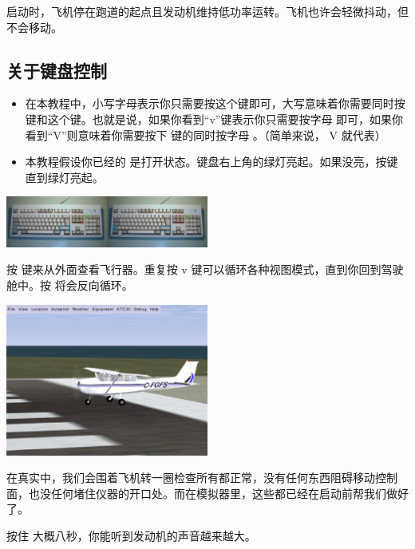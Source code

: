 启动时，飞机停在跑道的起点且发动机维持低功率运转。飞机也许会轻微抖动，但不会移动。

\subsection*{关于键盘控制}

\begin{itemize}
    \item 在本教程中，小写字母表示你只需要按这个键即可，大写意味着你需要同时按 \textcolor{blue}{} 键和这个键。也就是说，如果你看到“v”键表示你只需要按字母  即可，如果你看到“V”则意味着你需要按下  键的同时按字母 。（简单来说， V 就代表）
    \item 本教程假设你已经的  是打开状态。键盘右上角的绿灯亮起。如果没亮，按\textcolor{green}{}键直到绿灯亮起。
    \end{itemize}

\begin{center}
\includegraphics[width=0.5\textwidth]{img/tut_7}
\end{center}
    

按  键来从外面查看飞行器。重复按 v 键可以循环各种视图模式，直到你回到驾驶舱中。按  将会反向循环。

\begin{center}
\includegraphics[width=0.5\textwidth]{img/tut_8}
\end{center}

在真实中，我们会围着飞机转一圈检查所有都正常，没有任何东西阻碍移动控制面，也没任何堵住仪器的开口处。而在模拟器里，这些都已经在启动前帮我们做好了。

按住  大概八秒，你能听到发动机的声音越来越大。

